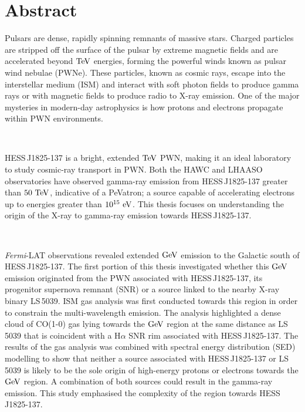 \chapter{Abstract}
Pulsars are dense, rapidly spinning remnants of massive stars. Charged particles are stripped off the surface of the pulsar by extreme magnetic fields and are accelerated beyond $\TeV$ energies, forming the powerful winds known as pulsar wind nebulae (PWNe). These particles, known as cosmic rays, escape into the interstellar medium (ISM) and interact with soft photon fields to produce gamma rays or with magnetic fields to produce radio to X-ray emission. One of the major mysteries in modern-day astrophysics is how protons and electrons propagate within PWN environments.
\par~\par
\mbox{HESS\,J1825-137} is a bright, extended $\TeV$ PWN, making it an ideal laboratory to study cosmic-ray transport in PWN. Both the HAWC and LHAASO observatories have observed gamma-ray emission from \mbox{HESS\,J1825-137} greater than $50~\TeV$, indicative of a PeVatron; a source capable of accelerating electrons up to energies greater than $10^{15}~\si{\electronvolt}$. This thesis focuses on understanding the origin of the X-ray to gamma-ray emission towards \mbox{HESS\,J1825-137}.
\par~\par
\textit{Fermi}-LAT observations revealed extended $\si{\giga\electronvolt}$ emission to the Galactic south of \mbox{HESS\,J1825-137}. The first portion of this thesis investigated whether this $\si{\giga\electronvolt}$ emission originated from the PWN associated with \mbox{HESS\,J1825-137}, its progenitor supernova remnant (SNR) or a source linked to the nearby X-ray binary \mbox{LS\,5039}. ISM gas analysis was first conducted towards this region in order to constrain the multi-wavelength emission. The analysis highlighted a dense cloud of CO(1-0) gas lying towards the $\si{\giga\electronvolt}$ region at the same distance as \mbox{LS\,5039} that is coincident with a H$\alpha$ SNR rim associated with \mbox{HESS\,J1825-137}. The results of the gas analysis was combined with spectral energy distribution (SED) modelling to show that neither a source associated with \mbox{HESS\,J1825-137} or \mbox{LS\,5039} is likely to be the sole origin of high-energy protons or electrons towards the $\si{\giga\electronvolt}$ region. A combination of both sources could result in the gamma-ray emission. This study emphasised the complexity of the region towards \mbox{HESS\,J1825-137}.
\par~\par
